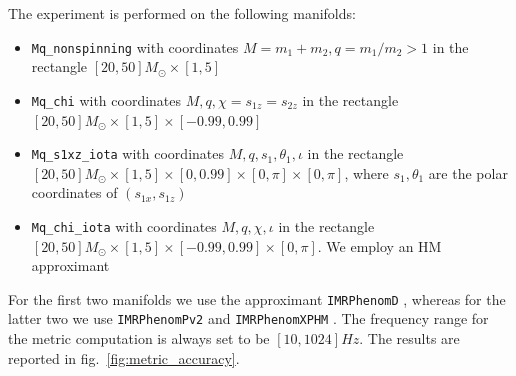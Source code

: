 \documentclass[twocolumn,showpacs,preprintnumbers,nofootinbib,prd,
superscriptaddress,10pt]{revtex4-2}
\begin{document}
The experiment is performed on the following manifolds:
\begin{itemize}
	\item \texttt{Mq\_nonspinning} with coordinates $M = m_1+m_2, q = m_1/m_2>1$ in the rectangle $[20, 50] M_\odot \times [1,5]$
	\item \texttt{Mq\_chi} with coordinates $M, q, \chi = s_{1z} = s_{2z}$ in the rectangle $[20, 50] M_\odot \times [1,5] \times [-0.99, 0.99]$
	\item \texttt{Mq\_s1xz\_iota} with coordinates $M, q, s_{1}, \theta_1, \iota$ in the rectangle $[20, 50] M_\odot \times [1,5] \times [0, 0.99] \times [0,\pi]  \times [0,\pi]$, where $s_1, \theta_1$ are the polar coordinates of $(s_{1x}, s_{1z})$
	\item \texttt{Mq\_chi\_iota} with coordinates $M, q, \chi, \iota$ in the rectangle $[20, 50] M_\odot \times [1,5] \times [-0.99, 0.99] \times [0,\pi]$. We employ an HM approximant
\end{itemize}

For the first two manifolds we use the approximant \texttt{IMRPhenomD} \cite{PhysRevD.93.044006, PhysRevD.93.044007}, whereas for the latter two we use \texttt{IMRPhenomPv2} \cite{PhysRevLett.113.151101} and \texttt{IMRPhenomXPHM} \cite{PhysRevD.103.104056}. The frequency range for the metric computation is always set to be $[10, 1024]Hz$.
The results are reported in fig.~\ref{fig:metric_accuracy}.
\end{document}
